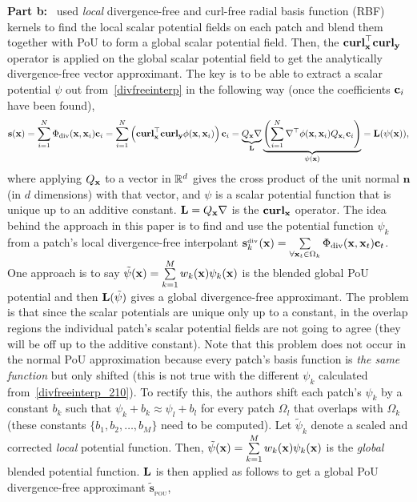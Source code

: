 {\bf Part b:}~\citep{drake2021partition} used \emph{local} divergence-free and curl-free radial basis function (RBF) kernels to find the local scalar potential fields on each patch and blend them together with PoU to form a global scalar potential field. Then, the $\textbf{curl}_{\mathbf{x}}^{\top} \textbf{curl}_{\mathbf{y}}$ operator is applied on the global scalar potential field to get the analytically divergence-free vector approximant. The key is to be able to extract a scalar potential $\psi$ out from~\eqref{divfreeinterp} in the following way (once the coefficients $\mathbf{c}_i$ have been found),
\begin{align}
\mathbf{s}(\mathbf{x}) = \sum\limits_{i=1}^{N} \Phi_{\text{div}}(\mathbf{x}, \mathbf{x}_i) \mathbf{c}_i = \sum\limits_{i=1}^{N} \left(\textbf{curl}_{\mathbf{x}}^{\top} \textbf{curl}_{\mathbf{y}} \phi(\mathbf{x}, \mathbf{x}_i)\right) \mathbf{c}_i = \underbrace{Q_{\mathbf{x}} \nabla}_{\mathbf{L}} \underbrace{\left(\sum\limits_{i=1}^{N} \nabla^{\top} \phi(\mathbf{x}, \mathbf{x}_i) Q_{\mathbf{x}_i} \mathbf{c}_i \right)}_{\psi(\mathbf{x})} = \mathbf{L}(\psi(\mathbf{x})), \label{divfreeinterp_210}
\end{align}
where applying $Q_{\mathbf{x}}$ to a vector in $\mathbb{R}^d$ gives the cross product of the unit normal $\mathbf{n}$ (in $d$ dimensions) with that vector, and $\psi$ is a scalar potential function that is unique up to an additive constant. $\mathbf{L} = Q_{\mathbf{x}} \nabla$ is the $\textbf{curl}_{\mathbf{x}}$ operator. The idea behind the approach in this paper is to find and use the potential function $\psi_k$ from a patch's local divergence-free interpolant ${\mathbf{s}_k^{_{\text{div}}}(\mathbf{x}) = \sum\limits_{\forall \mathbf{x}_t \in \Omega_k} \Phi_{\text{div}}(\mathbf{x}, \mathbf{x}_t) \mathbf{c}_t}$. One approach is to say ${\tilde{\psi}(\mathbf{x}) = \sum\limits_{k=1}^{M} w_k(\mathbf{x}) \psi_k(\mathbf{x})}$ is the blended global PoU potential and then $\mathbf{L}(\tilde{\psi})$ gives a global divergence-free approximant. The problem is that since the scalar potentials are unique only up to a constant, in the overlap regions the individual patch's scalar potential fields are not going to agree (they will be off up to the additive constant). Note that this problem does not occur in the normal PoU approximation because every patch's basis function is \emph{the same function} but only shifted (this is not true with the different $\psi_k$ calculated from~\eqref{divfreeinterp_210}). To rectify this, the authors shift each patch's $\psi_k$ by a constant $b_k$ such that $\psi_k + b_k \approx \psi_l + b_l$ for every patch $\Omega_l$ that overlaps with $\Omega_k$ (these constants $\{b_1, b_2, \dots, b_M\}$ need to be computed). Let $\tilde{\psi}_k$ denote a scaled and corrected \emph{local} potential function. Then, ${\tilde{\psi}(\mathbf{x}) = \sum\limits_{k=1}^{M} w_k(\mathbf{x}) \psi_k(\mathbf{x})}$ is the \emph{global} blended potential function. $\mathbf{L}$ is then applied as follows to get a global PoU divergence-free approximant $\tilde{\mathbf{s}}_{_{\text{POU}}}$,
